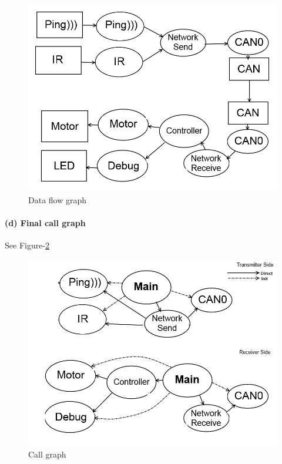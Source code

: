 \documentclass[a4paper]{article}
\newlength{\pic}
\begin{document}
\setlength{\pic}{0.8\textwidth}
\begin{figure}[htp]
\center
\includegraphics[width=\pic]{pic/dataflow}
\caption{Data flow graph} \label{df}
\end{figure}

\paragraph{(d) Final call graph \\}
See Figure-\ref{cg}

\setlength{\pic}{0.8\textwidth}
\begin{figure}[htp]
\center
\includegraphics[width=\pic]{pic/callgraph}
\caption{Call graph} \label{cg}
\end{figure}
\end{document}
